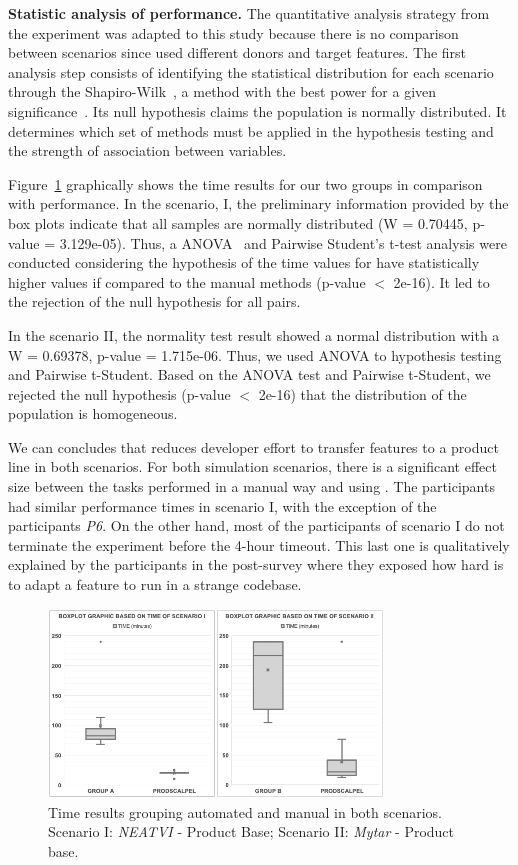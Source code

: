 \textbf{Statistic analysis of performance.} The quantitative analysis strategy from the experiment was adapted to this study because there is no comparison between scenarios since used different donors and target features. The first analysis step consists of identifying the statistical distribution for each scenario through the Shapiro-Wilk~\cite{SHAPIRO1965}, a method with the best power for a given significance~\cite{Razali2011}. Its null hypothesis claims the population is normally distributed. It determines which set of methods must be applied in the hypothesis testing and the strength of association between variables. 

Figure~\ref{fig:experiment_result_boxplot} graphically shows the time results for our two groups in comparison with \autoscalpel performance. In the scenario, I, the preliminary information provided by the box plots indicate that all samples are normally distributed (W = 0.70445, p-value = 3.129e-05). Thus, a ANOVA~\cite{Gelman2005} and Pairwise Student’s t-test analysis were conducted considering the hypothesis of the time values for \autoscalpel have statistically higher values if compared to the manual methods (p-value $<$ 2e-16). It led to the rejection of the null hypothesis for all pairs. 

In the scenario II, the normality test result showed a normal distribution with a W = 0.69378, p-value = 1.715e-06. Thus, we used ANOVA to hypothesis testing and Pairwise t-Student. Based on the ANOVA test and Pairwise t-Student, we rejected the null hypothesis (p-value $<$ 2e-16) that the distribution of the population is homogeneous.

We can concludes that \autoscalpel reduces developer effort to transfer features to a product line in both scenarios. For both simulation scenarios, there is a significant effect size between the tasks performed in a manual way and using \autoscalpel. The participants had similar performance times in scenario I, with the exception of the participants \emph{P6}. On the other hand, most of the participants of scenario I do not terminate the experiment before the 4-hour timeout. This last one is qualitatively explained by the participants in the post-survey where they exposed how 
hard is to adapt a feature to run in a strange codebase. 
 
\begin{figure}[t]
	\centering \includegraphics[width=8.9cm]{images/experiment_time_results.png}
	\centering 
	\caption{Time results grouping automated and manual in both scenarios.  Scenario I: \emph{NEATVI} - Product Base; Scenario II: \emph{Mytar} - Product base.}
	\label{fig:experiment_result_boxplot}
\end{figure} 


